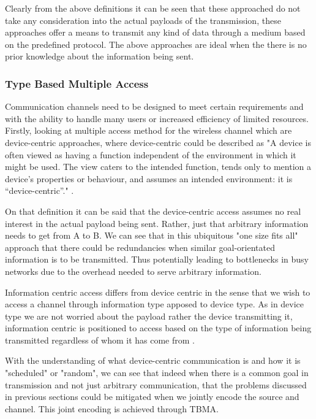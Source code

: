 \documentclass{article}
\begin{document}
Clearly from the above definitions it can be seen that these approached do not take any consideration into the actual payloads of the transmission, these approaches offer a means to transmit any kind of data through a medium based on the predefined protocol. The above approaches are ideal when the there is no prior knowledge about the information being sent.

\subsubsection{Type Based Multiple Access}

Communication channels need to be designed to meet certain requirements and with the ability to handle many users or increased efficiency of limited resources. Firstly, looking at multiple access method for the wireless channel which are device-centric approaches, where device-centric could be described as "A device is often viewed as having a function independent of the environment in which it might be used. The view caters to the intended function, tends only to mention a device’s properties or behaviour, and assumes an intended environment: it is “device-centric”." \cite{device-centric}.

On that definition it can be said that the device-centric access assumes no real interest in the actual payload being sent. Rather, just that arbitrary information needs to get from A to B. We can see that in this ubiquitous "one size fits all" approach that there could be redundancies when similar goal-orientated information is to be transmitted. Thus potentially leading to bottlenecks in busy networks due to the overhead needed to serve arbitrary information. 

Information centric access differs from device centric in the sense that we wish to access a channel through information type apposed to device type. As in device type we are not worried about the payload rather the device transmitting it, information centric is positioned to access based on the type of information being transmitted regardless of whom it has come from \cite{information_centric}.

With the understanding of what device-centric communication is and how it is "scheduled" or "random", we can see that indeed when there is a common goal in transmission and not just arbitrary communication, that the problems discussed in previous sections could be mitigated when we jointly encode the source and channel. This joint encoding is achieved through \ac{TBMA}. 
\end{document}
